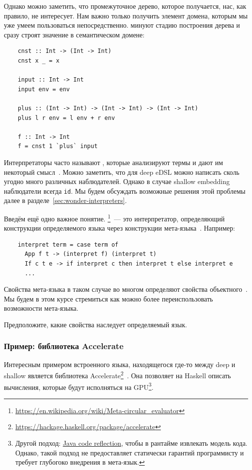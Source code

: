 Однако можно заметить, что промежуточное дерево, которое получается, нас, как правило, не интересует.
Нам важно только получить элемент домена, которым мы уже умеем пользоваться непосредственно.
 минуют стадию построения дерева и сразу строят значение в семантическом домене:
\begin{verbatim}
    cnst :: Int -> (Int -> Int)
    cnst x _ = x

    input :: Int -> Int
    input env = env

    plus :: (Int -> Int) -> (Int -> Int) -> (Int -> Int)
    plus l r env = l env + r env

    f :: Int -> Int
    f = cnst 1 `plus` input
\end{verbatim}

Интерпретаторы часто называют , которые анализируют термы и дают им некоторый смысл~\cite{gibbons2013functional}.
Можно заметить, что для deep eDSL можно написать сколь угодно много различных наблюдателей.
Однако в случае shallow embedding наблюдатели всегда \texttt{id}.
Мы будем обсуждать возможные решения этой проблемы далее в разделе~\ref{sec:wonder-interpreters}.

Введём ещё одно важное понятие.
\footnote{\url{https://en.wikipedia.org/wiki/Meta-circular_evaluator}}~--- это интерпретатор, определяющий конструкции определяемого языка через конструкции мета-языка~\cite{reynolds1972definitional}.
Например:
\begin{verbatim}
    interpret term = case term of
      App f t -> (interpret f) (interpret t)
      If c t e -> if interpret c then interpret t else interpret e
      ...
\end{verbatim}

Свойства мета-языка в таком случае во многом определяют свойства объектного~\cite{reynolds1972definitional,reynolds1998definitional}.
Мы будем в этом курсе стремиться как можно более переиспользовать возможности мета-языка.

\begin{task}
    Предположите, какие свойства наследует определяемый язык.
\end{task}

\subsubsection{Пример: библиотека Accelerate}

Интересным примером встроенного языка, находящегося где-то между deep и shallow является библиотека Accelerate\footnote{\url{https://hackage.haskell.org/package/accelerate}}~\cite[глава 6]{marlow2011parallel}.
Она позволяет на Haskell описать вычисления, которые будут исполняться на GPU\footnote{Другой подход: \href{https://youtu.be/6c0DB2kwF_Q?si=-nB7AkCsDWB_Q-hy}{Java code reflection}, чтобы в рантайме извлекать модель кода. Однако, такой подход не предоставляет статически гарантий программисту и требует глубогоко внедрения в мета-язык.}.

